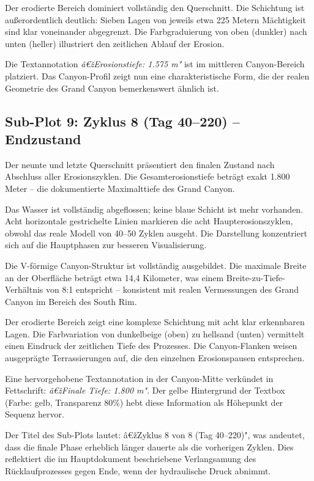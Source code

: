 ﻿\documentclass[12pt,a4paper]{report}
\begin{document}
Der erodierte Bereich dominiert vollständig den Querschnitt. Die Schichtung ist außerordentlich deutlich: Sieben Lagen von jeweils etwa 225 Metern Mächtigkeit sind klar voneinander abgegrenzt. Die Farbgraduierung von oben (dunkler) nach unten (heller) illustriert den zeitlichen Ablauf der Erosion.

Die Textannotation \textit{â€žErosionstiefe: 1.575 m"} ist im mittleren Canyon-Bereich platziert. Das Canyon-Profil zeigt nun eine charakteristische Form, die der realen Geometrie des Grand Canyon bemerkenswert ähnlich ist.

\subsection{Sub-Plot 9: Zyklus 8 (Tag 40--220) -- Endzustand}

Der neunte und letzte Querschnitt präsentiert den finalen Zustand nach Abschluss aller Erosionszyklen. Die Gesamterosionstiefe beträgt exakt 1.800 Meter -- die dokumentierte Maximalttiefe des Grand Canyon.

Das Wasser ist vollständig abgeflossen; keine blaue Schicht ist mehr vorhanden. Acht horizontale gestrichelte Linien markieren die acht Haupterosionszyklen, obwohl das reale Modell von 40--50 Zyklen ausgeht. Die Darstellung konzentriert sich auf die Hauptphasen zur besseren Visualisierung.

Die V-förmige Canyon-Struktur ist vollständig ausgebildet. Die maximale Breite an der Oberfläche beträgt etwa 14,4 Kilometer, was einem Breite-zu-Tiefe-Verhältnis von 8:1 entspricht -- konsistent mit realen Vermessungen des Grand Canyon im Bereich des South Rim.

Der erodierte Bereich zeigt eine komplexe Schichtung mit acht klar erkennbaren Lagen. Die Farbvariation von dunkelbeige (oben) zu hellsand (unten) vermittelt einen Eindruck der zeitlichen Tiefe des Prozesses. Die Canyon-Flanken weisen ausgeprägte Terrassierungen auf, die den einzelnen Erosionspausen entsprechen.

Eine hervorgehobene Textannotation in der Canyon-Mitte verkündet in Fettschrift: \textit{â€žFinale Tiefe: 1.800 m"}. Der gelbe Hintergrund der Textbox (Farbe: gelb, Transparenz 80\%) hebt diese Information als Höhepunkt der Sequenz hervor.

Der Titel des Sub-Plots lautet: â€žZyklus 8 von 8 (Tag 40--220)", was andeutet, dass die finale Phase erheblich länger dauerte als die vorherigen Zyklen. Dies reflektiert die im Hauptdokument beschriebene Verlangsamung des Rücklaufprozesses gegen Ende, wenn der hydraulische Druck abnimmt.
\end{document}
